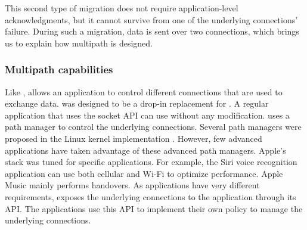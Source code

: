 
This second type of migration does not require application-level
acknowledgments, but it cannot survive from one of the
underlying connections' failure. During such a migration, data is sent over two
connections, which brings us to explain how multipath is designed.

\subsubsection{Multipath capabilities}

Like \mptcp, \tcpls allows an application to control different \tcp connections
that are used to exchange data. \mptcp was designed to be a drop-in replacement
for \tcp. A regular application that uses the socket API can use \mptcp without
any modification. \mptcp uses a path manager to control the underlying \tcp
connections. Several path managers were proposed in the Linux kernel
implementation \cite{TODO}. However, few advanced applications have taken
advantage of these advanced path managers. Apple's \mptcp stack was tuned for
specific applications. For example, the Siri voice recognition application can
use both cellular and Wi-Fi to optimize performance. Apple Music mainly
performs handovers. As applications have very different requirements, \tcpls
exposes the underlying \tcp connections to the application through its API. The
applications use this API to implement their own policy to manage the
underlying \tcp connections.

